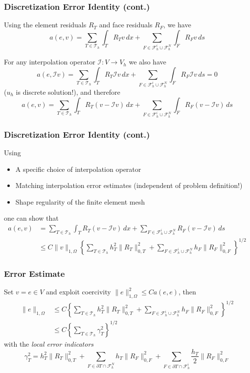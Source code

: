 \documentclass[ignorenonframetext,11pt]{beamer}
\theoremstyle{definition}
\begin{document}
\begin{frame}
\frametitle{Discretization Error Identity (cont.)}
Using the element residuals $R_T$ and face residuals $R_F$, we have
\begin{equation*}
  a(e,v) = \sum_{T \in \mathcal{T}_h} \int_T R_T v \,dx + \sum_{F \in \mathcal{F}_h^i \cup \mathcal{F}_h^N} \int_F R_F v \,ds
\end{equation*}

For any interpolation operator $\mathcal{I} \colon V \to V_h$ we also have
\begin{equation*}
  a(e,\mathcal{I}v) = \sum_{T \in \mathcal{T}_h} \int_T R_T \mathcal{I} v \,dx + \sum_{F \in \mathcal{F}_h^i \cup \mathcal{F}_h^N} \int_F R_F \mathcal{I} v \,ds = 0
\end{equation*}
($u_h$ is discrete solution!), and therefore
\begin{equation*}
  a(e,v) = \sum_{T \in \mathcal{T}_h} \int_T R_T (v - \mathcal{I} v) \,dx + \sum_{F \in \mathcal{F}_h^i \cup \mathcal{F}_h^N} \int_F R_F (v - \mathcal{I} v) \,ds
\end{equation*}
\end{frame}

\begin{frame}
\frametitle{Discretization Error Identity (cont.)}
Using
\begin{itemize}
  \item A specific choice of interpolation operator
  \item Matching interpolation error estimates (independent of problem definition!)
  \item Shape regularity of the finite element mesh
\end{itemize}
one can show that
\begin{align*}
  a(e,v) &= \sum_{T \in \mathcal{T}_h} \int_T R_T (v - \mathcal{I} v) \,dx + \sum_{F \in \mathcal{F}_h^i \cup \mathcal{F}_h^N} R_F (v - \mathcal{I} v) \,ds \\
  &\leq C \| v \|_{1,\Omega} \left\{ \sum_{T \in \mathcal{T}_h} h_T^2 \|R_T\|_{0,T}^2 + \sum_{F \in \mathcal{F}_h^i \cup \mathcal{F}_h^N} h_F \| R_F \|_{0,F}^2 \right\}^{1/2}
\end{align*}
\end{frame}

\begin{frame}
\frametitle{Error Estimate}
Set $v = e \in V$ and exploit coercivity $\|e\|_{1,\Omega}^2 \leq C a(e,e)$, then
\begin{align*}
  \|e\|_{1,\Omega} &\leq C \left\{ \sum_{T \in \mathcal{T}_h} h_T^2 \|R_T\|_{0,T}^2 + \sum_{F \in \mathcal{F}_h^i \cup \mathcal{F}_h^N} h_F \|R_F\|_{0,F}^2 \right\}^{1/2} \\
  &\leq C \left\{ \sum_{T \in \mathcal{T}_h} \gamma_T^2 \right\}^{1/2}
\end{align*}
with the \emph{local error indicators}
\begin{equation*}
  \gamma_T^2 = h_T^2 \|R_T\|_{0,T}^2 + \sum_{F \in \partial T \cap \mathcal{F}_h^N} h_T \|R_F\|_{0,F}^2 + \sum_{F \in \partial T \cap \mathcal{F}_h^i} \frac{h_T}{2} \|R_F\|_{0,F}^2
\end{equation*}
\end{frame}
\end{document}
